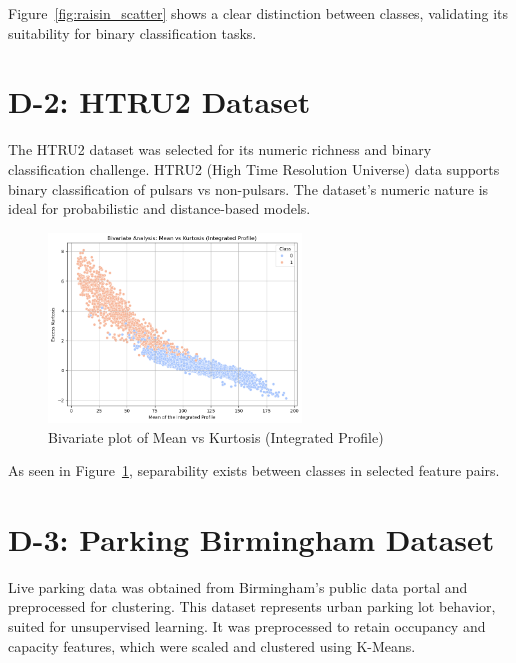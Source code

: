Figure~\ref{fig:raisin_scatter} shows a clear distinction between classes, validating its suitability for binary classification tasks.

\section{D-2: HTRU2 Dataset}
\label{sec:dataset_htru2}

The HTRU2 dataset \cite{htru2_dataset} was selected for its numeric richness and binary classification challenge. HTRU2 (High Time Resolution Universe) data supports binary classification of pulsars vs non-pulsars. The dataset's numeric nature is ideal for probabilistic and distance-based models.

\begin{figure}[H]
    \centering
    \includegraphics[width=0.6\textwidth]{figures/htru2_scatter.png}
    \caption{Bivariate plot of Mean vs Kurtosis (Integrated Profile)}
    \label{fig:htru2_scatter}
\end{figure}

As seen in Figure~\ref{fig:htru2_scatter}, separability exists between classes in selected feature pairs.

\section{D-3: Parking Birmingham Dataset}
\label{sec:dataset_parking}

Live parking data was obtained from Birmingham’s public data portal \cite{parking_dataset} and preprocessed for clustering. This dataset represents urban parking lot behavior, suited for unsupervised learning. It was preprocessed to retain occupancy and capacity features, which were scaled and clustered using K-Means.

